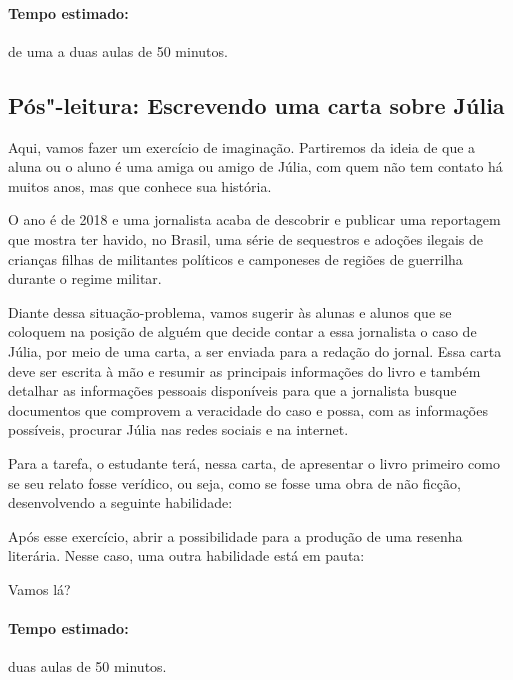 \documentclass[12pt]{extarticle}
\begin{document}
\paragraph{Tempo estimado:} de uma a duas aulas de 50 minutos.

\subsection{Pós"-leitura: Escrevendo uma carta sobre Júlia}

Aqui, vamos fazer um exercício de imaginação. Partiremos da ideia de que
a aluna ou o aluno é uma amiga ou amigo de Júlia, com quem não tem
contato há muitos anos, mas que conhece sua história.

O ano é de 2018 e uma jornalista acaba de descobrir e publicar uma
reportagem que mostra ter havido, no Brasil, uma série de sequestros e
adoções ilegais de crianças filhas de militantes políticos e camponeses
de regiões de guerrilha durante o regime militar.

Diante dessa situação-problema, vamos sugerir às alunas e alunos que se
coloquem na posição de alguém que decide contar a essa jornalista o caso
de Júlia, por meio de uma carta, a ser enviada para a redação do jornal.
Essa carta deve ser escrita à mão e resumir as principais informações do
livro e também detalhar as informações pessoais disponíveis para que a
jornalista busque documentos que comprovem a veracidade do caso e possa,
com as informações possíveis, procurar Júlia nas redes sociais e na
internet.

Para a tarefa, o estudante terá, nessa carta, de apresentar o livro primeiro como se seu relato fosse verídico, ou seja, como se fosse uma obra de não ficção, desenvolvendo a seguinte habilidade:


Após esse exercício, abrir a possibilidade para a produção de uma resenha literária. Nesse caso, uma outra habilidade está em pauta:


Vamos lá?

\paragraph{Tempo estimado:} duas aulas de 50 minutos.



\end{document}
